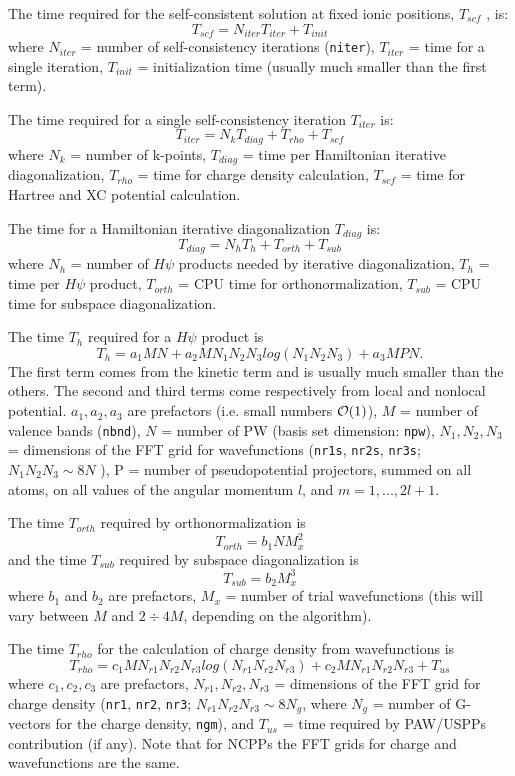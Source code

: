 \documentclass[12pt,a4paper]{article}
\begin{document}
The time required for the self-consistent solution at fixed ionic
positions, $T_{scf}$ , is:
$$T_{scf} = N_{iter} T_{iter} + T_{init}$$
where $N_{iter}$  = number of self-consistency iterations (\texttt{niter}), 
$T_{iter}$ =
time for a single iteration, $T_{init}$ = initialization time
(usually much smaller than the first term).

The time required for a single self-consistency iteration $T_{iter}$ is:
$$T_{iter} = N_k T_{diag} +T_{rho} + T_{scf}$$
where $N_k$ = number of k-points, $T_{diag}$ = time per 
Hamiltonian iterative diagonalization, $T_{rho}$ = time for charge density 
calculation, $T_{scf}$ = time for Hartree and XC potential
calculation.
    
The time for a Hamiltonian iterative diagonalization $T_{diag}$ is:
$$T_{diag} = N_h T_h + T_{orth} + T_{sub}$$
where $N_h$ = number of $H\psi$ products needed by iterative diagonalization,
$T_h$ = time per $H\psi$ product, $T_{orth}$ = CPU time for 
orthonormalization, $T_{sub}$ = CPU time for subspace diagonalization.
    
The time $T_h$ required for a $H\psi$ product is
$$T_h = a_1 M N + a_2 M N_1 N_2 N_3 log(N_1 N_2 N_3 ) + a_3 M P N. $$
The first term comes from the kinetic term and is usually much smaller
than the others. The second and third terms come respectively from local
and nonlocal potential. $a_1, a_2, a_3$ are prefactors (i.e.
small numbers ${\cal O}(1)$), $M$ = number of valence
bands (\texttt{nbnd}), $N$ = number of PW (basis set dimension: \texttt{npw}), $N_1, N_2, N_3$ =
dimensions of the FFT grid for wavefunctions (\texttt{nr1s}, \texttt{nr2s},
\texttt{nr3s}; $N_1 N_2 N_3 \sim 8N$ ), 
P = number of pseudopotential projectors, summed on all atoms, on all values of the
angular momentum $l$, and $m = 1, . . . , 2l + 1$.

The time $T_{orth}$ required by orthonormalization is
$$T_{orth} = b_1 N M_x^2$$ 
and the time $T_{sub}$ required by subspace diagonalization is
$$T_{sub} = b_2 M_x^3$$
where $b_1$ and $b_2$ are prefactors, $M_x$ = number of trial wavefunctions 
(this will vary between $M$ and $2\div4 M$, depending on the algorithm).
    
The time $T_{rho}$ for the calculation of charge density from wavefunctions is
$$T_{rho} = c_1 M N_{r1} N_{r2}N_{r3} log(N_{r1} N_{r2} N_{r3}) + 
            c_2 M N_{r1} N_{r2} N_{r3} + T_{us}$$
where $c_1, c_2, c_3$ are prefactors, $N_{r1}, N_{r2}, N_{r3}$ =
dimensions of the FFT grid for charge density (\texttt{nr1},
\texttt{nr2}, \texttt{nr3}; $N_{r1} N_{r2} N_{r3} \sim 8N_g$,
where $N_g$ = number of G-vectors for the charge density,
\texttt{ngm}), and 
$T_{us}$ = time required by PAW/USPPs contribution (if any).
Note that for NCPPs the FFT grids for charge and
wavefunctions are the same.
 
\end{document}
